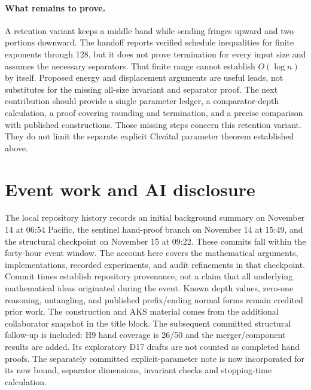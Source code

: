 \documentclass[11pt]{article}
\begin{document}
\paragraph{What remains to prove.}
A retention variant keeps a middle band while sending fringes upward and two portions downward. The handoff reports verified schedule inequalities for finite exponents through 128, but it does not prove termination for every input size and assumes the necessary separators. That finite range cannot establish $O(\log n)$ by itself. Proposed energy and displacement arguments are useful leads, not substitutes for the missing all-size invariant and separator proof. The next contribution should provide a single parameter ledger, a comparator-depth calculation, a proof covering rounding and termination, and a precise comparison with published constructions. Those missing steps concern this retention variant. They do not limit the separate explicit Chv\'atal parameter theorem established above.

\section{Event work and AI disclosure}\label{sec:provenance}
The local repository history records an initial background summary on November 14 at 06:54 Pacific, the sentinel hand-proof branch on November 14 at 15:49, and the structural checkpoint on November 15 at 09:22. These commits fall within the forty-hour event window. The account here covers the mathematical arguments, implementations, recorded experiments, and audit refinements in that checkpoint. Commit times establish repository provenance, not a claim that all underlying mathematical ideas originated during the event. Known depth values, zero-one reasoning, untangling, and published prefix/ending normal forms remain credited prior work. The construction and AKS material comes from the additional collaborator snapshot in the title block. The subsequent committed structural follow-up is included: H9 hand coverage is 26/50 and the merger/component results are added. Its exploratory D17 drafts are not counted as completed hand proofs. The separately committed explicit-parameter note is now incorporated for its new bound, separator dimensions, invariant checks and stopping-time calculation.
\end{document}
